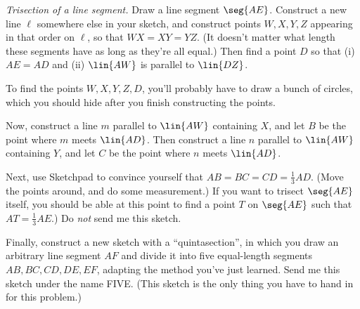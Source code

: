 \begin{SA}
\label{SA:trisection}
\textit{Trisection of a line segment.}
Draw a line segment $\seg{AE}$.  Construct a new line $\ell$ somewhere 
else in your sketch, and construct points $W, X, Y, Z$ appearing in that order on $\ell$,
so that $WX=XY=YZ$.  (It doesn't matter what length these segments have
as long as they're all equal.)  Then
find a point $D$ so that (i) $AE=AD$ and (ii) $\lin{AW}$
is parallel to $\lin{DZ}$.

To find the points $W,X,Y,Z,D$, you'll probably
have to draw a bunch of circles, which you should
hide after you finish constructing the points.

Now, construct a line $m$ parallel to $\lin{AW}$ containing $X$,
and let $B$ be the point where $m$ meets $\lin{AD}$.  Then
construct a line $n$ parallel to $\lin{AW}$ containing $Y$,
and let $C$ be the point where $n$ meets $\lin{AD}$.

Next, use Sketchpad to convince yourself that $AB=BC=CD=\frac13AD$. (Move 
the points around, and do some measurement.)  If you want to trisect 
$\seg{AE}$ itself, you should be able at this point to find a point $T$ on 
$\seg{AE}$ such that $AT=\frac13AE$.) Do \emph{not} send me this sketch.


Finally, construct a new sketch with a ``quintasection'',
in which you draw an arbitrary line segment
$AF$ and divide it into five equal-length segments $AB,BC,CD,DE,EF$,
adapting the method you've just learned.  Send me this sketch
under the name FIVE.  (This sketch is the only thing you have to hand in for
this problem.)
\end{SA}

